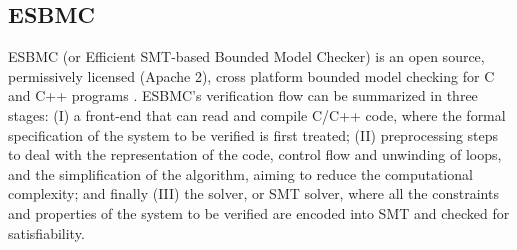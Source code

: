 \documentclass[journal]{IEEEtran}
\begin{document}
\subsection{ESBMC}
ESBMC (or Efficient SMT-based Bounded Model Checker) is an open source, permissively licensed (Apache 2), cross platform bounded model checking for C and C++ programs \cite{esbmc2018}. 
%
ESBMC's verification flow can be summarized in three stages: (I) a front-end that can read and compile C/C++ code, where the formal specification of the system to be verified is first treated; (II) preprocessing steps to deal with the representation of the code, control flow and unwinding of loops, and the simplification of the algorithm, aiming to reduce the computational complexity; and finally (III) the solver, or SMT solver, where all the constraints and properties of the system to be verified are encoded into SMT and checked for satisfiability.
%
%
%
\end{document}
